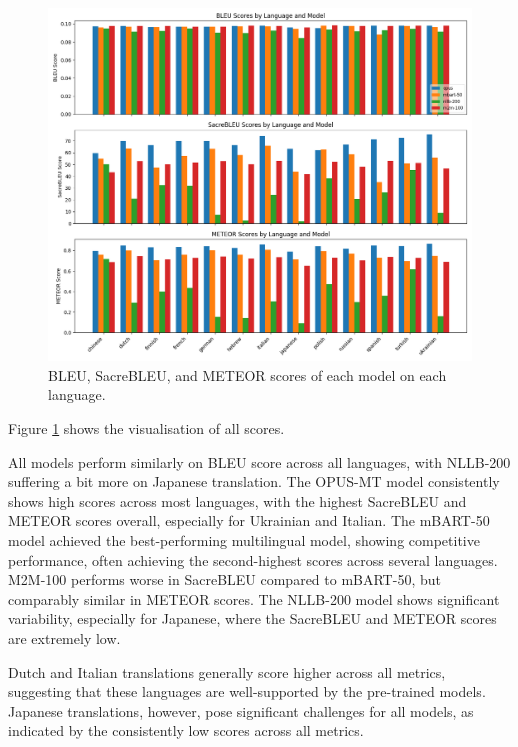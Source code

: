 \documentclass[a4paper]{article}
\begin{document}
\begin{figure}[htbp]
    \centering
    \includegraphics[width=1\linewidth]{figures/metrics_bar.png}
    \caption{BLEU, SacreBLEU, and METEOR scores of each model on each language.}
    \label{fig:result_visual}
\end{figure}

Figure \ref{fig:result_visual} shows the visualisation of all scores.

All models perform similarly on BLEU score across all languages, with NLLB-200 suffering a bit more on Japanese translation. The OPUS-MT model consistently shows high scores across most languages, with the highest SacreBLEU and METEOR scores overall, especially for Ukrainian and Italian. The mBART-50 model achieved the best-performing multilingual model, showing competitive performance, often achieving the second-highest scores across several languages. M2M-100 performs worse in SacreBLEU compared to mBART-50, but comparably similar in METEOR scores. The NLLB-200 model shows significant variability, especially for Japanese, where the SacreBLEU and METEOR scores are extremely low.

Dutch and Italian translations generally score higher across all metrics, suggesting that these languages are well-supported by the pre-trained models. Japanese translations, however, pose significant challenges for all models, as indicated by the consistently low scores across all metrics.
\end{document}
